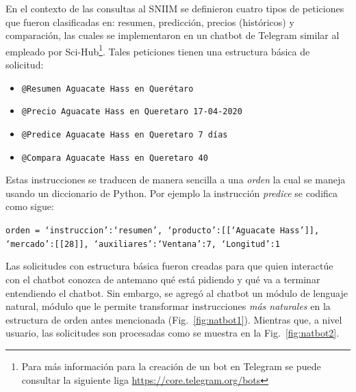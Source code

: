En el contexto de las consultas al SNIIM se definieron cuatro tipos de peticiones que fueron clasificadas en: resumen, predicción, precios (históricos) y comparación, las cuales se implementaron en un chatbot de Telegram similar al empleado por Sci-Hub\footnote{Para más información para la creación de un bot en Telegram se puede consultar la siguiente liga \url{https://core.telegram.org/bots}}. Tales peticiones tienen una estructura básica de solicitud:

\begin{itemize}
	\item \texttt{@Resumen Aguacate Hass en Querétaro}
	\item \texttt{@Precio Aguacate Hass en Queretaro 17-04-2020}             
	\item \texttt{@Predice Aguacate Hass en Queretaro 7 días}            
	\item \texttt{@Compara Aguacate Hass en Queretaro 40}
\end{itemize}

Estas instrucciones se traducen de manera sencilla a una \textit{orden} la cual se maneja usando un diccionario de Python. Por ejemplo la instrucción \textit{predice} se codifica como sigue:

\begin{center}
	\texttt{orden = \textbraceleft`instruccion':`resumen', `producto':[[`Aguacate Hass']], `mercado':[[28]], `auxiliares':\textbraceleft`Ventana':7, `Longitud':1\textbraceright\textbraceright}
\end{center}

Las solicitudes con estructura básica fueron creadas para que quien interactúe con el chatbot conozca de antemano qué está pidiendo y qué va a terminar entendiendo el chatbot. Sin embargo, se agregó al chatbot un módulo de lenguaje natural, módulo que le permite transformar instrucciones \textit{más naturales} en la estructura de orden antes mencionada (Fig.~\ref{fig:natbot1}). Mientras que, a nivel usuario, las solicitudes son procesadas como se muestra en la Fig.~\ref{fig:natbot2}.

